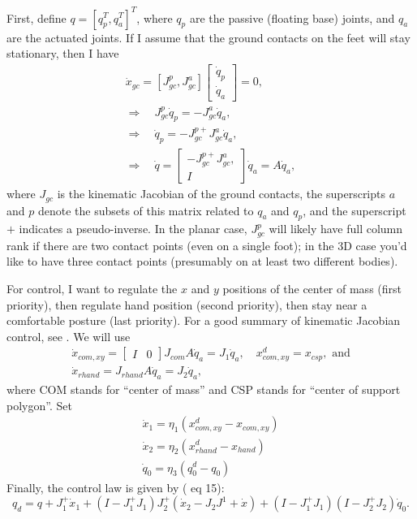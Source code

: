\documentclass{article}
\begin{document}
First, define $q = [q_p^T,q_a^T]^T$, where $q_p$ are the passive
(floating base) joints, and $q_a$ are the actuated joints.  If I
assume that the ground contacts on the feet will stay stationary, then
I have \begin{gather*} \dot{x}_{gc} = [ J_{gc}^p, J_{gc}^a
  ] \begin{bmatrix} \dot{q}_p \\ \dot{q}_a \end{bmatrix} = 0, \\
  \Rightarrow \quad J_{gc}^p \dot{q}_p = - J_{gc}^a \dot{q}_a, \\
  \Rightarrow \quad \dot{q}_p = -J_{gc}^{p+} J_{gc}^a \dot{q}_a, \\
  \Rightarrow \quad \dot{q} = \begin{bmatrix} -J_{gc}^{p+} J_{gc}^a,
    \\ I \end{bmatrix} \dot{q}_a = A \dot{q}_a, \end{gather*} where
$J_{gc}$ is the kinematic Jacobian of the ground contacts, the
superscripts $a$ and $p$ denote the subsets of this matrix related to
$q_a$ and $q_p$, and the superscript $+$ indicates a pseudo-inverse.
In the planar case, $J_{gc}^p$ will likely have full column rank if
there are two contact points (even on a single foot); in the 3D case
you'd like to have three contact points (presumably on at least two
different bodies).

For control, I want to regulate the $x$ and $y$ positions of the center of mass (first priority), then regulate hand position (second priority), then stay near a comfortable posture (last priority).  For a good summary of kinematic Jacobian control, see \cite{Siciliano90}.  We will use 
\begin{gather*} 
\dot{x}_{com,xy} = \begin{bmatrix} I & 0 \end{bmatrix} J_{com} A \dot{q}_a = J_1 \dot{q}_a, \quad x_{com,xy}^d = x_{csp}, \text{ and} \\
\dot{x}_{rhand} = J_{rhand} A \dot{q}_a = J_2 \dot{q}_a,
\end{gather*} 
where COM stands for ``center of mass'' and CSP stands for ``center of support polygon''.  Set \begin{gather*} \dot{x}_1 = \eta_1 (x_{com,xy}^d - x_{com,xy}) \\ 
\dot{x}_2 = \eta_2 (x_{rhand}^d - x_{hand}) \\ \dot{q}_0 = \eta_3 (q_{0}^d - q_0) \end{gather*} Finally, the control law is given by (\cite{Siciliano90} eq 15):
\[ q_d = q + J_1^+ \dot{x}_1 +  (I - J_1^+ J_1) J_2^+ (\dot{x}_2 - J_2 J^1+ \dot{x} ) + (I - J_1^+ J_1) (I - J_2^+ J_2) \dot{q}_0. \]






\end{document}
